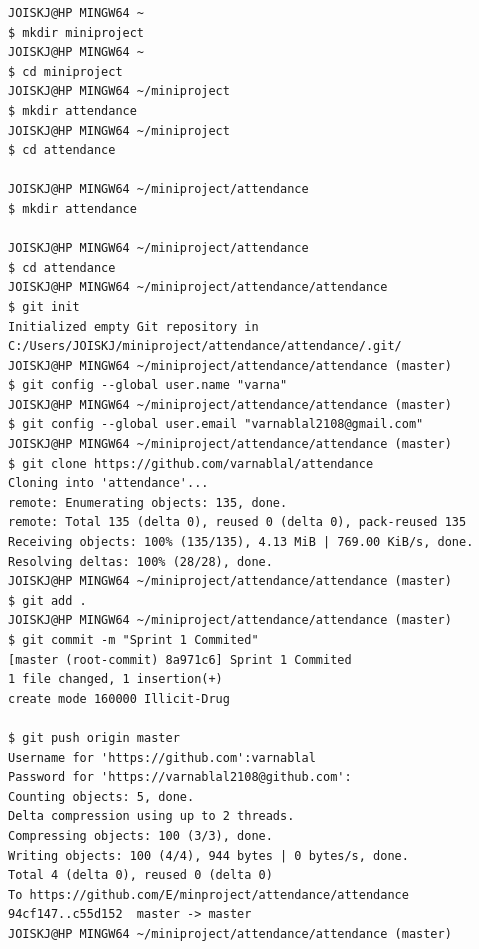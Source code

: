 \documentclass[a4paper, 12pt]{report}
\begin{document}
				\begin{lstlisting}
JOISKJ@HP MINGW64 ~
$ mkdir miniproject		
JOISKJ@HP MINGW64 ~
$ cd miniproject
JOISKJ@HP MINGW64 ~/miniproject
$ mkdir attendance
JOISKJ@HP MINGW64 ~/miniproject
$ cd attendance
		
JOISKJ@HP MINGW64 ~/miniproject/attendance
$ mkdir attendance
		
JOISKJ@HP MINGW64 ~/miniproject/attendance
$ cd attendance
JOISKJ@HP MINGW64 ~/miniproject/attendance/attendance
$ git init
Initialized empty Git repository in C:/Users/JOISKJ/miniproject/attendance/attendance/.git/
JOISKJ@HP MINGW64 ~/miniproject/attendance/attendance (master)
$ git config --global user.name "varna"
JOISKJ@HP MINGW64 ~/miniproject/attendance/attendance (master)
$ git config --global user.email "varnablal2108@gmail.com"
JOISKJ@HP MINGW64 ~/miniproject/attendance/attendance (master)
$ git clone https://github.com/varnablal/attendance
Cloning into 'attendance'...
remote: Enumerating objects: 135, done.
remote: Total 135 (delta 0), reused 0 (delta 0), pack-reused 135
Receiving objects: 100% (135/135), 4.13 MiB | 769.00 KiB/s, done.
Resolving deltas: 100% (28/28), done.
JOISKJ@HP MINGW64 ~/miniproject/attendance/attendance (master)
$ git add .
JOISKJ@HP MINGW64 ~/miniproject/attendance/attendance (master)
$ git commit -m "Sprint 1 Commited"
[master (root-commit) 8a971c6] Sprint 1 Commited
1 file changed, 1 insertion(+)
create mode 160000 Illicit-Drug
		
$ git push origin master
Username for 'https://github.com':varnablal
Password for 'https://varnablal2108@github.com': 
Counting objects: 5, done.
Delta compression using up to 2 threads.
Compressing objects: 100 (3/3), done.
Writing objects: 100 (4/4), 944 bytes | 0 bytes/s, done.
Total 4 (delta 0), reused 0 (delta 0)
To https://github.com/E/minproject/attendance/attendance 
94cf147..c55d152  master -> master
JOISKJ@HP MINGW64 ~/miniproject/attendance/attendance (master)
		

		\end{lstlisting}	
\newpage
\end{document}
